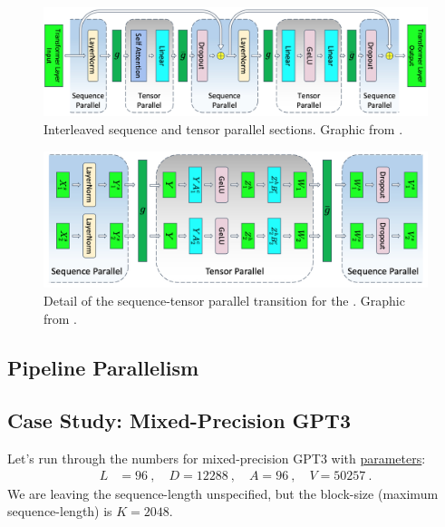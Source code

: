 \documentclass[11pt]{article}
\begin{document}
\begin{figure}[ht]
 \centering
 \includegraphics[scale=.25]{figures/transformer-tensor-sequence-parallel.jpg}
 \caption{Interleaved sequence and tensor parallel sections. Graphic from
 \cite{shoeybi2020megatronlm}. }
 \label{fig_tensor_seq_parallel}
\end{figure}

\begin{figure}[ht]
 \centering
 \includegraphics[scale=.25]{figures/mlp-tensor-sequence-parallel.jpg}
 \caption{Detail of the sequence-tensor parallel transition for the  . Graphic from
 \cite{shoeybi2020megatronlm}. }
 \label{fig_tensor_seq_parallel_detail}
\end{figure}


\subsection{Pipeline Parallelism \label{subsec_pipe_parallelism}}






\subsection{Case Study: Mixed-Precision GPT3 \label{subsec_gpt_mem_study} }

Let's run through the numbers for mixed-precision GPT3 with
\href{https://bmk.sh/2020/05/29/GPT-3-A-Brief-Summary/}{parameters}:
\begin{align}
L &= 96 \ , \quad
D = 12288 \ ,\quad
A = 96\ , \quad V = 50257\ .
 \label{eq_gpt_num}
\end{align}
We are leaving the sequence-length unspecified, but the block-size (maximum sequence-length) is $
K=2048 $.
\end{document}
